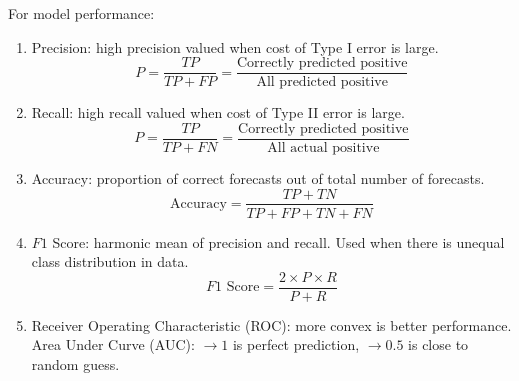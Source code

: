 For model performance:
\begin{enumerate}[label=\roman*.]
\setlength{\itemsep}{0pt}
\item Precision: high precision valued when cost of Type I error is large.
\begin{equation}
P = \frac{TP}{TP + FP} = \frac{\text{Correctly predicted positive}}{\text{All predicted positive}} \nonumber
\end{equation}
\item Recall: high recall valued when cost of Type II error is large.
\begin{equation}
P = \frac{TP}{TP + FN} = \frac{\text{Correctly predicted positive}}{\text{All actual positive}} \nonumber
\end{equation}
\item Accuracy: proportion of correct forecasts out of total number of forecasts.
\begin{equation}
\text{Accuracy} = \frac{TP + TN}{TP + FP + TN + FN} \nonumber
\end{equation}
\item $F1$ Score: harmonic mean of precision and recall. Used when there is unequal class distribution in data.
\begin{equation}
F1 \text{ Score} = \frac{2 \times P \times R}{P + R} \nonumber
\end{equation}
\item Receiver Operating Characteristic (ROC): more convex is better performance.\\
Area Under Curve (AUC): $\rightarrow 1$ is perfect prediction, $\rightarrow 0.5$ is close to random guess.
\end{enumerate}